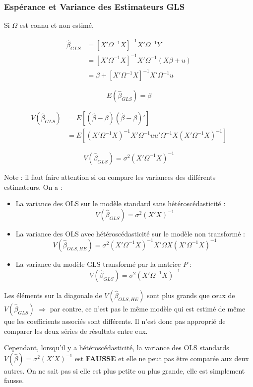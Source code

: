 \documentclass[14pt]{extarticle} %
\theoremstyle{definition}
\theoremstyle{plain}
\begin{document}
\subsubsection{Espérance et Variance des Estimateurs GLS}

Si $\Omega$ est connu et non estimé,

\begin{align*}
\hat{\beta}_{GLS} &= [X'\Omega^{-1}X]^{-1}X'\Omega^{-1}Y \\ &= [X'\Omega^{-1}X]^{-1}X'\Omega^{-1}(X\beta + u) \\ &= \beta + [X'\Omega^{-1}X]^{-1}X'\Omega^{-1}u
\end{align*}

\[
E(\hat{\beta}_{GLS}) = \beta
\]

\begin{align*}
V(\hat{\beta}_{GLS}) &= E[(\hat{\beta} - \beta)(\hat{\beta} - \beta)'] \\ &= E[(X'\Omega^{-1}X)^{-1}X'\Omega^{-1}u u'\Omega^{-1}X (X'\Omega^{-1}X)^{-1}]
\end{align*}

\[
V(\hat{\beta}_{GLS}) = \sigma^2 (X'\Omega^{-1}X)^{-1}
\]

Note : il faut faire attention si on compare les variances des différents estimateurs. On a :
\begin{itemize}
    \item La variance des OLS sur le modèle standard sans hétéroscédasticité :
    \[
    V(\hat{\beta}_{OLS}) = \sigma^2 (X'X)^{-1}
    \]
    \item La variance des OLS avec hétéroscédasticité sur le modèle non transformé :
    \[
    V(\hat{\beta}_{OLS, HE}) = \sigma^2 (X'\Omega^{-1}X)^{-1} X'\Omega X (X'\Omega^{-1}X)^{-1}
    \]
    \item La variance du modèle GLS transformé par la matrice $P$ :
    \[
    V(\hat{\beta}_{GLS}) = \sigma^2 (X'\Omega^{-1}X)^{-1}
    \]
\end{itemize}

Les éléments sur la diagonale de $V(\hat{\beta}_{OLS, HE})$ sont plus grands que ceux de $V(\hat{\beta}_{GLS})$ \(\Rightarrow\) par contre, ce n’est pas le même modèle qui est estimé de même que les coefficients associés sont différents. Il n’est donc pas approprié de comparer les deux séries de résultats entre eux.

Cependant, lorsqu’il y a hétéroscédasticité, la variance des OLS standards \( V(\hat{\beta}) = \sigma^2 (X'X)^{-1} \) est \textbf{FAUSSE} et elle ne peut pas être comparée aux deux autres. On ne sait pas si elle est plus petite ou plus grande, elle est simplement fausse.
\end{document}
